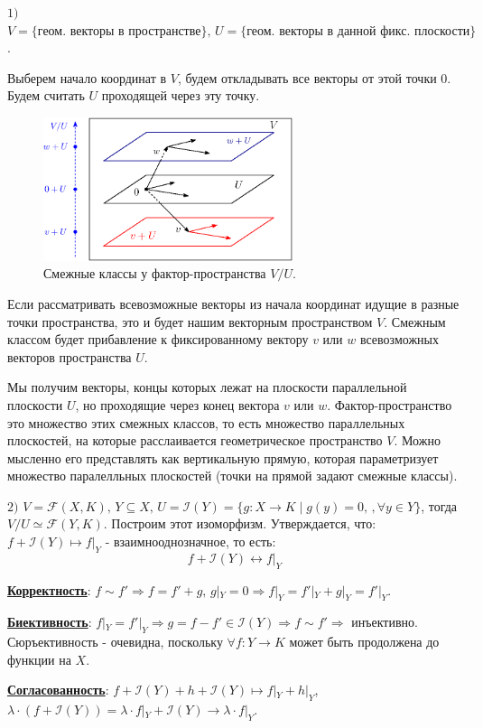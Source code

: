 \documentclass[12pt]{article}
\newcommand{\MCI}{\mathcal{I}}
\newcommand{\MF}{\mathcal{F}}
\theoremstyle{definition}
\begin{document}
$1)$ $V = \{\text{геом. векторы в пространстве}\}, \, U = \{\text{геом. векторы в данной фикс. плоскости}\}$.

Выберем начало координат в $V$, будем откладывать все векторы от этой точки $0$. Будем считать $U$ проходящей через эту точку.
\begin{figure}[H]
	\centering
	\includegraphics[width=0.65\textwidth]{LAL3_1.eps}
	\caption{Смежные классы у фактор-пространства $V/U$.}
	\label{3_1}
\end{figure}
Если рассматривать всевозможные векторы из начала координат идущие в разные точки пространства,  это и будет нашим векторным пространством $V$. Смежным классом будет прибавление к фиксированному вектору $v$ или $w$ всевозможных векторов пространства $U$. 

Мы получим векторы, концы которых лежат на плоскости параллельной плоскости $U$, но проходящие через конец вектора $v$ или $w$. Фактор-пространство это множество этих смежных классов, то есть множество параллельных плоскостей, на которые расслаивается геометрическое пространство $V$. Можно мысленно его представлять как вертикальную прямую, которая параметризует множество паралелльных плоскостей (точки на прямой задают смежные классы).

\newpage
$2)$ $V = \MF(X,K),\, Y \subseteq X, \, U = \MCI(Y) = \{g \colon X \to K \mid g(y) = 0, \, ,\forall y \in Y\} $, тогда $V/U \simeq \MF(Y,K)$. Построим этот изоморфизм. Утверждается, что: $f + \MCI(Y) \mapsto f|_Y$ - взаимнооднозначное, то есть: 
$$
	f + \MCI(Y) \leftrightarrow f|_Y
$$

\textbf{\uline{Корректность}}: $f \sim f' \Rightarrow f = f' + g, \, g|_Y = 0 \Rightarrow  f|_Y = f'|_Y + g|_Y = f'|_Y$.

\textbf{\uline{Биективность}}: $f|_Y = f'|_Y \Rightarrow g = f - f' \in \MCI(Y) \Rightarrow f \sim f' \Rightarrow$ инъективно. Сюръективность - очевидна, поскольку $\forall f \colon Y \to K$  может быть продолжена до функции на $X$.

\textbf{\uline{Согласованность}}: $f + \MCI(Y) + h + \MCI(Y) \mapsto f|_Y + h|_Y$, $\lambda{\cdot}(f + \MCI(Y)) = \lambda{\cdot}f|_Y + \MCI(Y) \to \lambda{\cdot}f|_Y$. 
\end{document}
